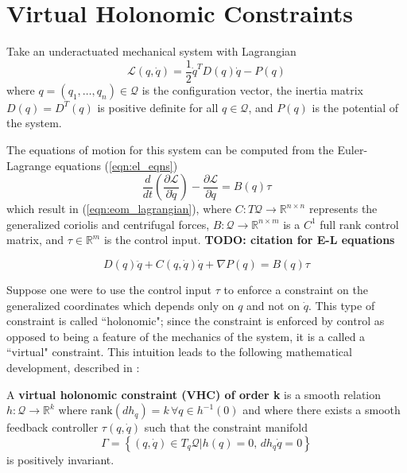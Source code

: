 
\section{Virtual Holonomic Constraints}\label{sec:vhcs}

Take an underactuated mechanical system with Lagrangian
\begin{equation}\label{eqn:lagrangian}
\mathcal{L}(q,\dot{q}) = \frac{1}{2} \dot{q}^T D(q) \dot{q} - P(q)
\end{equation}
where \(q = (q_1,\ldots,q_n) \in \mathcal{Q}\) is the configuration vector, 
the inertia matrix \(D(q) = D^T(q)\) is positive definite for all 
\(q \in \mathcal{Q}\), and \(P(q)\) is the potential of the system.


The equations of motion for this system can be computed from 
the Euler-Lagrange equations (\ref{eqn:el_eqns})
\begin{equation}\label{eqn:el_eqns}
   \frac{d}{dt} \left( \frac{\partial \mathcal{L}}{\partial \dot{q}}\right) -
   \frac{\partial \mathcal{L}}{\partial q} = B(q)\tau
\end{equation}
which result in (\ref{eqn:eom_lagrangian}), where
\(C : T\mathcal{Q} \rightarrow \mathbb{R}^{n \times n}\) represents the
generalized coriolis and centrifugal forces,
\(B : \mathcal{Q} \rightarrow \mathbb{R}^{n \times m}\) is a 
\(C^1\) full rank control matrix, and \(\tau \in \mathbb{R}^{m}\) is the control 
input. \textbf{TODO: citation for E-L equations}

\begin{equation}\label{eqn:eom_lagrangian}
D(q)\ddot{q} + C(q,\dot{q})\dot{q} + \nabla P(q) = B(q)\tau
\end{equation}

Suppose one were to use the control input \(\tau\) to enforce a
constraint on the generalized coordinates which depends only on \(q\) and not on
\(\dot{q}\). This type of constraint is called ``holonomic"; since the 
constraint is enforced by control as opposed to being a feature of the mechanics
of the system, it is a called a ``virtual" constraint. 
This intuition leads to the following mathematical development, described in 
\cite{vhcs_for_el_systems}:

\begin{defn}\label{defn:vhc_order_k}
   A \textbf{virtual holonomic constraint (VHC) of order k} is a smooth relation 
   \( h : \mathcal{Q} \rightarrow \mathbb{R}^k\) where
   \( \text{rank}(dh_q) = k \, \forall q \in h^{-1}(0)\) and where there exists
   a smooth feedback controller \(\tau(q,\dot{q})\) such that the constraint
   manifold
   \[
      \Gamma = \left\{ (q,\dot{q}) \in T_q\mathcal{Q} \vert h(q) = 0, \, 
      dh_q \dot{q} = 0\right\}
   \]
   is positively invariant.
\end{defn}

